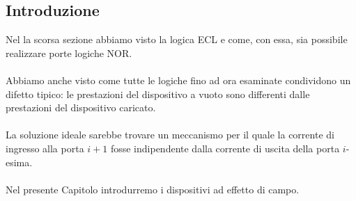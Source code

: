 \documentclass[../main.tex]{subfiles}
\begin{document}
	\subsection{Introduzione}
	Nel la scorsa sezione abbiamo visto la logica ECL e come, con essa, sia possibile realizzare porte logiche NOR.\\\\
	Abbiamo anche visto come tutte le logiche fino ad ora esaminate condividono un difetto tipico: le prestazioni del dispositivo a vuoto sono differenti dalle prestazioni del dispositivo caricato.\\\\
	La soluzione ideale sarebbe trovare un meccanismo per il quale la corrente di ingresso alla porta $i + 1$ fosse indipendente dalla corrente di uscita della porta $i$-esima.\\\\
	Nel presente Capitolo introdurremo i dispositivi ad effetto di campo.
\end{document}
